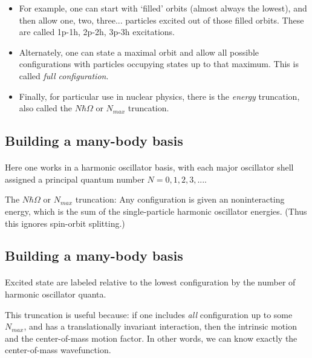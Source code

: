 \documentclass[%
twoside,                 %
final,                   %
10pt]{article}
\begin{document}
\begin{itemize}
\item For example, one can start with `filled' orbits (almost always the lowest), and then  allow one, two, three... particles excited out of those filled orbits. These are called  1p-1h, 2p-2h, 3p-3h excitations. 

\item Alternately, one can state a maximal orbit and allow all possible configurations with  particles occupying states up to that maximum. This is called \emph{full configuration}.

\item Finally, for particular use in nuclear physics, there is the \emph{energy} truncation, also  called the $N\hbar\Omega$ or $N_{max}$ truncation. 
\end{itemize}

\noindent



\subsection{Building a many-body basis}

\paragraph{}
 Here one works in a harmonic oscillator basis, with each major oscillator shell assigned 
a principal quantum number $N=0,1,2,3,...$. 

The $N\hbar\Omega$ or $N_{max}$ truncation: Any configuration is given an noninteracting energy, which is the sum 
of the single-particle harmonic oscillator energies. (Thus this ignores 
spin-orbit splitting.)




\subsection{Building a many-body basis}

\paragraph{}
Excited state are labeled relative to the lowest configuration by the 
number of harmonic oscillator quanta.

This truncation is useful because: if one includes \emph{all} configuration up to 
some $N_{max}$, and has a translationally invariant interaction, then the intrinsic 
motion and the center-of-mass motion factor. In other words, we can know exactly 
the center-of-mass wavefunction.
\end{document}
